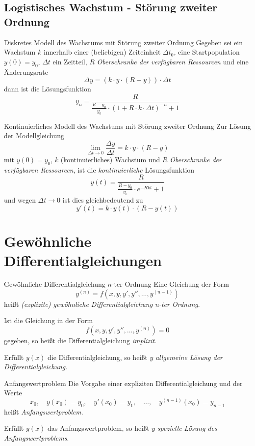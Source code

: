 \documentclass[german]{../spicker}
\begin{document}
\subsection{Logistisches Wachstum - Störung zweiter Ordnung}

\begin{defi}{Diskretes Modell des Wachstums mit Störung zweiter Ordnung}
    Gegeben sei ein Wachstum $k$ innerhalb einer (beliebigen) Zeiteinheit $\Delta t_0$, eine Startpopulation $y(0) = y_0$, $\Delta t$ ein Zeitteil, $R$ \emph{Oberschranke der verfügbaren Ressourcen} und eine Änderungsrate
    $$
        \Delta y = (k\cdot y \cdot (R-y)) \cdot \Delta t
    $$
    dann ist die Lösungsfunktion
    $$
        \boxed{y_n = \frac{R}{\frac{R-y_0}{y_0} \cdot (1 + R \cdot k \cdot \Delta t)^{-n} + 1}}
    $$
\end{defi}

\begin{defi}{Kontinuierliches Modell des Wachstums mit Störung zweiter Ordnung}
    Zur Lösung der Modellgleichung
    $$
        \lim_{\Delta t \to 0} \frac{\Delta y}{\Delta t} = k\cdot y \cdot (R-y)
    $$
    mit $y(0) = y_0$, $k$ (kontinuierliches) Wachstum und $R$ \emph{Oberschranke der verfügbaren Ressourcen}, ist die \emph{kontinuierliche} Lösungsfunktion
    $$
        \boxed{y(t) = \frac{R}{\frac{R-y_0}{y_0} \cdot e^{-Rkt} + 1}}
    $$
    und wegen $\Delta t \to 0$ ist dies gleichbedeutend zu
    $$
        y'(t) = k \cdot y(t) \cdot (R-y(t))
    $$
\end{defi}

\section{Gewöhnliche Differentialgleichungen}

\begin{defi}{Gewöhnliche Differentialgleichung $n$-ter Ordnung}
    Eine Gleichung der Form
    $$
        y^{(n)} = f(x, y, y', y'', \ldots, y^{(n-1)})
    $$
    heißt \emph{(explizite) gewöhnliche Differentialgleichung n-ter Ordnung}.

    Ist die Gleichung in der Form
    $$
        f(x, y, y', y'', \ldots, y^{(n)}) = 0
    $$
    gegeben, so heißt die Differentialgleichung \emph{implizit}.

    Erfüllt $y(x)$ die Differentialgleichung, so heißt $y$ \emph{allgemeine Lösung der Differentialgleichung}.
\end{defi}

\begin{defi}{Anfangswertproblem}
    Die Vorgabe einer expliziten Differentialgleichung und der Werte
    $$
        x_0, \quad y(x_0) = y_0, \quad y'(x_0) = y_1, \quad \ldots, \quad y^{(n-1)}(x_0) = y_{n-1}
    $$
    heißt \emph{Anfangswertproblem}.

    Erfüllt $y(x)$ das Anfangswertproblem, so heißt $y$ \emph{spezielle Lösung des Anfangswertproblems}.
\end{defi}
\end{document}
